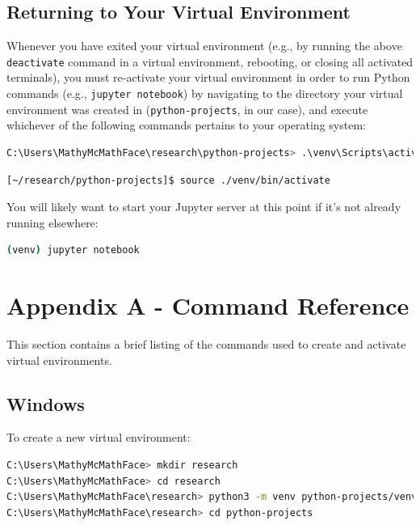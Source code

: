 \documentclass[12pt]{article}
\begin{document}
\pagebreak
\subsection{Returning to Your Virtual Environment}\label{sec:jupyter-notebooks-returning}

Whenever you have exited your virtual environment (e.g., by running the above \texttt{deactivate} command in a virtual
environment, rebooting, or closing all activated terminals), you must re-activate your virtual environment in order to
run Python commands (e.g., \texttt{jupyter notebook}) by navigating to the directory your virtual environment was
 created in (\texttt{python-projects}, in our case), and execute whichever of the following commands pertains to your
operating system:

\begin{lstlisting}[language=bash, caption=Activate Virtual Environment (Windows)]
C:\Users\MathyMcMathFace\research\python-projects> .\venv\Scripts\activate
\end{lstlisting}

\begin{lstlisting}[language=bash, caption=Activate Virtual Environment (MacOS/Linux)]
[~/research/python-projects]$ source ./venv/bin/activate
\end{lstlisting}

You will likely want to start your Jupyter server at this point if it's not already
running elsewhere:

\begin{lstlisting}[language=bash, caption=Starting Jupyter (Windows)]
(venv) jupyter notebook
\end{lstlisting}

\pagebreak
\section{Appendix A - Command Reference}\label{sec:appendix-a}

This section contains a brief listing of the commands used to create and activate
virtual environments.

\subsection{Windows}\label{sec:appendix-a-windows}

To create a new virtual environment:

\begin{lstlisting}[language=bash, caption=Create a Virtual Environment (Windows)]
C:\Users\MathyMcMathFace> mkdir research
C:\Users\MathyMcMathFace> cd research
C:\Users\MathyMcMathFace\research> python3 -m venv python-projects/venv
C:\Users\MathyMcMathFace\research> cd python-projects
\end{lstlisting}
\end{document}
